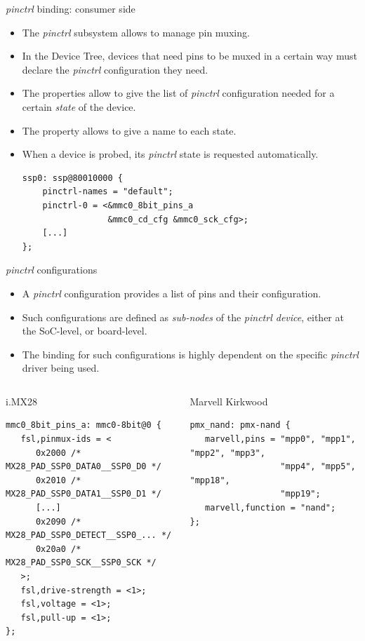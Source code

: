 \documentclass[obeyspaces,spaces,hyphens]{beamer}
\begin{document}
\begin{frame}[fragile]{{\em pinctrl} binding: consumer side}
  \begin{itemize}
  \item The {\em pinctrl} subsystem allows to manage pin muxing.
  \item In the Device Tree, devices that need pins to be muxed in a
    certain way must declare the {\em pinctrl} configuration they
    need.
  \item The  properties allow to give the list of
    {\em pinctrl} configuration needed for a certain {\em state} of
    the device.
  \item The  property allows to give a name to
    each state.
  \item When a device is probed, its  {\em pinctrl}
    state is requested automatically.
    \begin{block}{}
      \begin{verbatim}
ssp0: ssp@80010000 {
    pinctrl-names = "default";
    pinctrl-0 = <&mmc0_8bit_pins_a
                 &mmc0_cd_cfg &mmc0_sck_cfg>;
    [...]
};
\end{verbatim}
    \end{block}
  \end{itemize}
\end{frame}

\begin{frame}[fragile]{{\em pinctrl} configurations}
  \begin{itemize}
  \item A {\em pinctrl} configuration provides a list of pins and
    their configuration.
  \item Such configurations are defined as {\em sub-nodes} of the {\em
      pinctrl device}, either at the SoC-level, or board-level.
  \item The binding for such configurations is highly dependent on the
    specific {\em pinctrl} driver being used.
  \end{itemize}
  \begin{columns}
    \begin{block}{i.MX28}
      \begin{verbatim}
mmc0_8bit_pins_a: mmc0-8bit@0 {
   fsl,pinmux-ids = <
      0x2000 /* MX28_PAD_SSP0_DATA0__SSP0_D0 */
      0x2010 /* MX28_PAD_SSP0_DATA1__SSP0_D1 */
      [...]
      0x2090 /* MX28_PAD_SSP0_DETECT__SSP0_... */
      0x20a0 /* MX28_PAD_SSP0_SCK__SSP0_SCK */
   >;
   fsl,drive-strength = <1>;
   fsl,voltage = <1>;
   fsl,pull-up = <1>;
};
\end{verbatim}
\end{block}
    \begin{block}{Marvell Kirkwood}
      \begin{verbatim}
pmx_nand: pmx-nand {
   marvell,pins = "mpp0", "mpp1", "mpp2", "mpp3",
                  "mpp4", "mpp5", "mpp18",
                  "mpp19";
   marvell,function = "nand";
};
        \end{verbatim}
      \end{block}
  \end{columns}
\end{frame}
\end{document}
